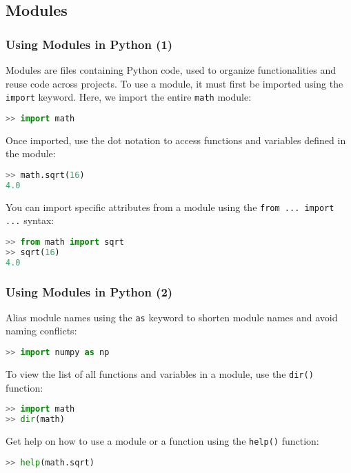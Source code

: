 \subsection*{Modules}
\begin{frame}[fragile]
  \frametitle{Using Modules in Python (1)}
  Modules are files containing Python code, used to organize functionalities and reuse code across projects. To use a module, it must first be imported using the \lstinline{import} keyword. Here, we import the entire \lstinline{math} module:
  \begin{lstlisting}[language=Python, numbers=none]
>> import math
  \end{lstlisting}\pause
  Once imported, use the dot notation to access functions and variables defined in the module:
  \begin{lstlisting}[language=Python, numbers=none]
>> math.sqrt(16)
4.0
  \end{lstlisting}\pause
  You can import specific attributes from a module using the \lstinline{from ... import ...} syntax:
  \begin{lstlisting}[language=Python, numbers=none]
>> from math import sqrt
>> sqrt(16)
4.0
  \end{lstlisting}
\end{frame}

\begin{frame}[fragile]
  \frametitle{Using Modules in Python (2)}
  Alias module names using the \lstinline{as} keyword to shorten module names and avoid naming conflicts:
  \begin{lstlisting}[language=Python, numbers=none]
>> import numpy as np
  \end{lstlisting}\pause
  To view the list of all functions and variables in a module, use the \lstinline{dir()} function:
  \begin{lstlisting}[language=Python, numbers=none]
>> import math
>> dir(math)
  \end{lstlisting}\pause
  Get help on how to use a module or a function using the \lstinline{help()} function:
  \begin{lstlisting}[language=Python, numbers=none]
>> help(math.sqrt)
  \end{lstlisting}
\end{frame}

